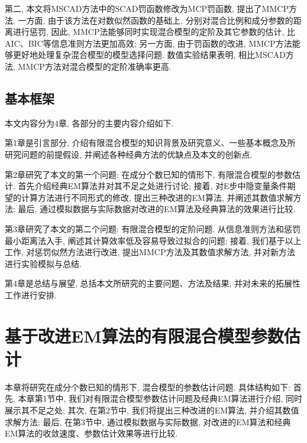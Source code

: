 \documentclass[a4paper,12pt,openany,oneside,utf-8]{ctexbook}
\begin{document}
第二, 本文将MSCAD方法中的SCAD罚函数修改为MCP罚函数, 提出了MMCP方法. 一方面, 由于该方法在对数似然函数的基础上, 分别对混合比例和成分参数的距离进行惩罚, 因此, MMCP法能够同时实现混合模型的定阶及其它参数的估计, 比AIC、BIC等信息准则方法更加高效; 另一方面, 由于罚函数的改进, MMCP方法能够更好地处理复杂混合模型的模型选择问题. 数值实验结果表明, 相比MSCAD方法, MMCP方法对混合模型的定阶准确率更高.

%
%
%

\section{基本框架}
本文内容分为4章, 各部分的主要内容介绍如下.

第1章是引言部分, 介绍有限混合模型的知识背景及研究意义、一些基本概念及所研究问题的前提假设, 并阐述各种经典方法的优缺点及本文的创新点.

第2章研究了本文的第一个问题: 在成分个数已知的情形下, 有限混合模型的参数估计. 首先介绍经典EM算法并对其不足之处进行讨论; 接着, 对E步中隐变量条件期望的计算方法进行不同形式的修改, 提出三种改进的EM算法, 并阐述其数值求解方法; 最后, 通过模拟数据与实际数据对改进的EM算法及经典算法的效果进行比较.

第3章研究了本文的第二个问题: 有限混合模型的定阶问题. 从信息准则方法和惩罚最小距离法入手, 阐述其计算效率低及容易导致过拟合的问题; 接着, 我们基于以上工作, 对惩罚似然方法进行改进, 提出MMCP方法及其数值求解方法, 并对新方法进行实验模拟与总结.

第4章是总结与展望, 总括本文所研究的主要问题、方法及结果, 并对未来的拓展性工作进行安排.


\chapter[基于改进EM算法的有限混合模型参数估计]{基于改进EM算法的有限混合模型参数估计}
\label{chap:Modified EM algorithms for parameter estimation in finite mixture models}
本章将研究在成分个数已知的情形下, 混合模型的参数估计问题. 具体结构如下: 首先, 本章第1节中, 我们对有限混合模型参数估计问题及经典EM算法进行介绍, 同时展示其不足之处; 其次, 在第2节中, 我们将提出三种改进的EM算法, 并介绍其数值求解方法; 最后, 在第3节中, 通过模拟数据与实际数据, 对改进的EM算法和经典EM算法的收敛速度、参数估计效果等进行比较.
\end{document}
